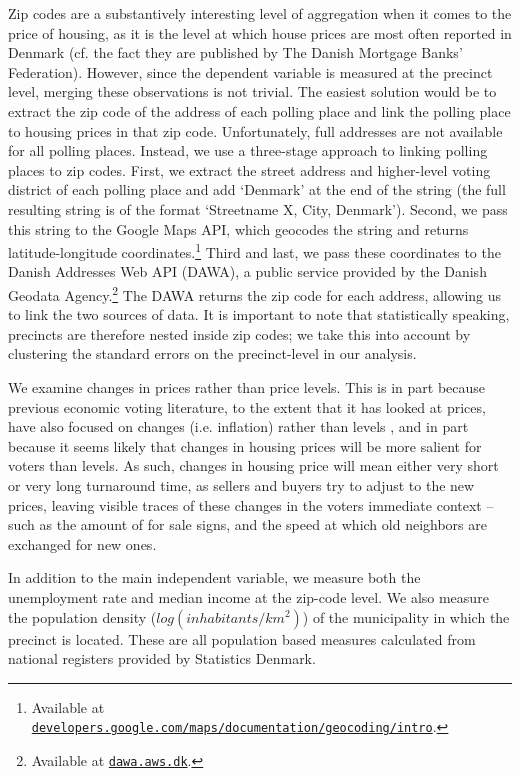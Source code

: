 \documentclass[12pt,a4paper]{article}
\begin{document}
Zip codes are a substantively interesting level of aggregation when it comes to the price of housing, as it is the level at which house prices are most often reported in Denmark (cf. the fact they are published by The Danish Mortgage Banks' Federation). However, since the dependent variable is measured at the precinct level, merging these observations is not trivial. The easiest solution would be to extract the zip code of the address of each polling place and link the polling place to housing prices in that zip code. Unfortunately, full addresses are not available for all polling places. Instead, we use a three-stage approach to linking polling places to zip codes. First, we extract the street address and higher-level voting district of each polling place and add `Denmark' at the end of the string (the full resulting string is of the format `Streetname X, City, Denmark'). Second, we pass this string to the Google Maps API, which geocodes the string and returns latitude-longitude coordinates.\footnote{Available at \texttt{\href{https://developers.google.com/maps/documentation/geocoding/intro}{developers.google.com/maps/documentation/geocoding/intro}}.} Third and last, we pass these coordinates to the Danish Addresses Web API (DAWA), a public service provided by the Danish Geodata Agency.\footnote{Available at \texttt{\href{http://dawa.aws.dk/}{dawa.aws.dk}}.} The DAWA returns the zip code for each address, allowing us to link the two sources of data. It is important to note that statistically speaking, precincts are therefore nested inside zip codes; we take this into account by clustering the standard errors on the precinct-level in our analysis.

We examine changes in prices rather than price levels. This is in part because previous economic voting literature, to the extent that it has looked at prices, have also focused on changes (i.e. inflation) rather than levels \citep[cf.][]{kramer1971short}, and in part because it seems likely that changes in housing prices will be more salient for voters than levels. As such, changes in housing price will mean either very short or very long turnaround time, as sellers and buyers try to adjust to the new prices, leaving visible traces of these changes in the voters immediate context -- such as the amount of for sale signs, and the speed at which old neighbors are exchanged for new ones.

In addition to the main independent variable, we measure both the unemployment rate and median income at the zip-code level. We also measure the population density ($log(inhabitants/km^2)$) of the municipality in which the precinct is located. These are all population based measures calculated from national registers provided by Statistics Denmark. 
\end{document}
